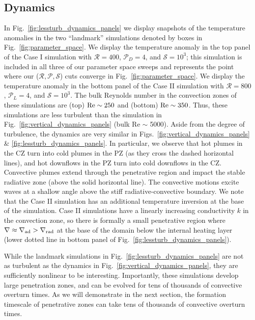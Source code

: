 \documentclass[twocolumn]{aastex631}
\newcommand{\gradrad}{\ensuremath{\nabla_{\rm{rad}}}}
\newcommand{\gradad}{\ensuremath{\nabla_{\rm{ad}}}}
\newcommand{\justgrad}{\ensuremath{\nabla}}
\newcommand{\mP}{\ensuremath{\mathcal{P}}}
\newcommand{\mR}{\ensuremath{\mathcal{R}}}
\newcommand{\mS}{\ensuremath{\mathcal{S}}}
\begin{document}
\subsection{Dynamics}
In Fig.~\ref{fig:lessturb_dynamics_panels} we display snapshots of the temperature anomalies in the two ``landmark'' simulations denoted by boxes in Fig.~\ref{fig:parameter_space}.
We display the temperature anomaly in the top panel of the Case I simulation with $\mR = 400$, $\mP_D = 4$, and $\mS = 10^3$; this simulation is included in all three of our parameter space sweeps and represents the point where our ($\mR, \mP, \mS$) cuts converge  in Fig.~\ref{fig:parameter_space}.
We display the temperature anomaly in the bottom panel of the Case II simulation with $\mR = 800$, $\mP_L = 4$, and $\mS = 10^3$.
The bulk Reynolds number in the convection zones of these simulations are (top) $\rm{Re} \sim 250$ and (bottom) $\rm{Re} \sim 350$.
Thus, these simulations are less turbulent than the simulation in Fig.~\ref{fig:vertical_dynamics_panels} (bulk Re $\sim$ 5000).
Aside from the degree of turbulence, the dynamics are very similar in Figs.~\ref{fig:vertical_dynamics_panels} \& \ref{fig:lessturb_dynamics_panels}.
In particular, we observe that hot plumes in the CZ turn into cold plumes in the PZ (as they cross the dashed horizontal lines), and hot downflows in the PZ turn into cold downflows in the CZ.
Convective plumes extend through the penetrative region and impact the stable radiative zone (above the solid horizontal line).
The convective motions excite waves at a shallow angle above the stiff radiative-convective boundary.
We note that the Case II simulation has an additional temperature inversion at the base of the simulation.
Case II simulations have a linearly increasing conductivity $k$ in the convection zone, so there is formally a small penetrative region where $\justgrad \approx \gradad > \gradrad$ at the base of the domain below the internal heating layer (lower dotted line in bottom panel of Fig.~\ref{fig:lessturb_dynamics_panels}).

While the landmark simulations in Fig.~\ref{fig:lessturb_dynamics_panels} are not as turbulent as the dynamics in Fig.~\ref{fig:vertical_dynamics_panels}, they are sufficiently nonlinear to be interesting.
Importantly, these simulations develop large penetration zones, and can be evolved for tens of thousands of convective overturn times.
As we will demonstrate in the next section, the formation timescale of penetrative zones can take tens of thousands of convective overturn times.
\end{document}
